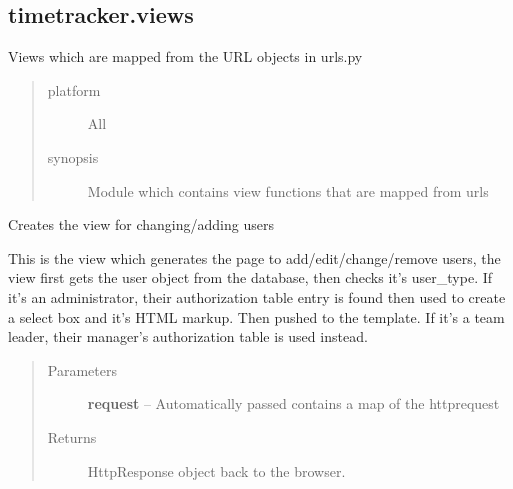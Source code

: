 \documentclass[letterpaper,10pt,english]{sphinxmanual}
\begin{document}
\subsection{timetracker.views}
\label{code:module-timetracker.views}\label{code:timetracker-views}
Views which are mapped from the URL objects in urls.py
\begin{quote}\begin{description}
\item[{platform}] \leavevmode
All

\item[{synopsis}] \leavevmode
Module which contains view functions that are mapped from urls

\end{description}\end{quote}

\begin{fulllineitems}
\label{code:timetracker.views.add_change_user}
Creates the view for changing/adding users

This is the view which generates the page to add/edit/change/remove users,
the view first gets the user object from the database, then checks it's
user\_type. If it's an administrator, their authorization table entry is
found then used to create a select box and it's HTML markup. Then pushed
to the template. If it's a team leader, their manager's authorization
table is used instead.
\begin{quote}\begin{description}
\item[{Parameters}] \leavevmode
\textbf{request} -- Automatically passed contains a map of the httprequest

\item[{Returns}] \leavevmode
HttpResponse object back to the browser.

\end{description}\end{quote}

\end{fulllineitems}

\end{document}
